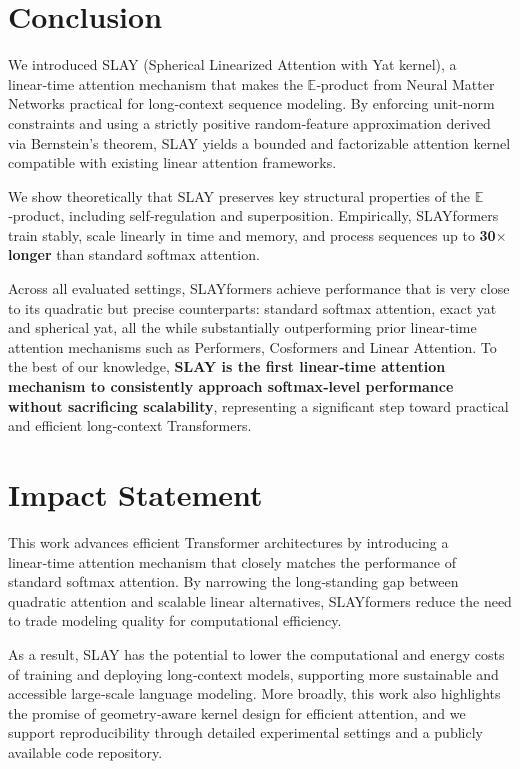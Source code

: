 \documentclass{article}
\begin{document}
\section{Conclusion}
\label{sec:conclusion}

We introduced SLAY (Spherical Linearized Attention with Yat kernel), a linear‑time attention mechanism that makes the $\mathbb{E}$‑product from Neural Matter Networks practical for long‑context sequence modeling. By enforcing unit‑norm constraints and using a strictly positive random‑feature approximation derived via Bernstein’s theorem, SLAY yields a bounded and factorizable attention kernel compatible with existing linear attention frameworks.

We show theoretically that SLAY preserves key structural properties of the $\mathbb{E}$‑product, including self‑regulation and superposition. Empirically, SLAYformers train stably, scale linearly in time and memory, and process sequences up to \textbf{30$\times$ longer} than standard softmax attention.

Across all evaluated settings, SLAYformers achieve performance that is very close to its quadratic but precise counterparts: standard softmax attention, exact yat and spherical yat, all the while substantially outperforming prior linear‑time attention mechanisms such as Performers, Cosformers and Linear Attention. To the best of our knowledge, \textbf{SLAY is the first linear‑time attention mechanism to consistently approach softmax‑level performance without sacrificing scalability}, representing a significant step toward practical and efficient long‑context Transformers.

\section*{Impact Statement}

This work advances efficient Transformer architectures by introducing a linear‑time attention mechanism that closely matches the performance of standard softmax attention. By narrowing the long‑standing gap between quadratic attention and scalable linear alternatives, SLAYformers reduce the need to trade modeling quality for computational efficiency.

As a result, SLAY has the potential to lower the computational and energy costs of training and deploying long‑context models, supporting more sustainable and accessible large‑scale language modeling. More broadly, this work also highlights the promise of geometry‑aware kernel design for efficient attention, and we support reproducibility through detailed experimental settings and a publicly available code repository.


\end{document}
